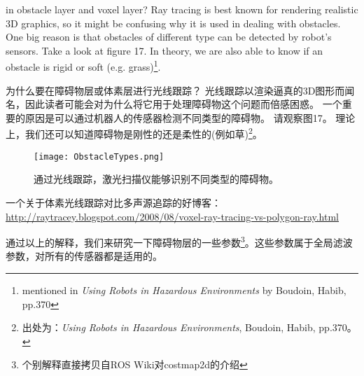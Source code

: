 
in obstacle layer and voxel layer? Ray tracing is best known for rendering realistic 3D graphics, so it might be confusing why it is used in dealing with obstacles. One big reason is that obstacles of different type can be detected by robot's sensors. Take a look at figure 17. In theory, we are also able to know if an obstacle is rigid or soft (e.g. grass)\footnote{ mentioned in \textit{Using Robots in Hazardous Environments} by Boudoin, Habib, pp.370}.

为什么要在障碍物层或体素层进行光线跟踪？
光线跟踪以渲染逼真的3D图形而闻名，因此读者可能会对为什么将它用于处理障碍物这个问题而倍感困惑。
一个重要的原因是可以通过机器人的传感器检测不同类型的障碍物。
请观察图17。
理论上，我们还可以知道障碍物是刚性的还是柔性的(例如草)\footnote{出处为：\textit{Using Robots in Hazardous Environments}, Boudoin, Habib, pp.370。}。

\begin{figure}[!h]
	\begin{center}
		\texttt{[image: ObstacleTypes.png]}
		\caption{通过光线跟踪，激光扫描仪能够识别不同类型的障碍物。}
	\end{center}
\end{figure}

一个关于体素光线跟踪对比多声源追踪的好博客：
\url{http://raytracey.blogspot.com/2008/08/voxel-ray-tracing-vs-polygon-ray.html} 

通过以上的解释，我们来研究一下障碍物层的一些参数\footnote{个别解释直接拷贝自ROS Wiki对costmap2d的介绍}。这些参数属于全局滤波参数，对所有的传感器都是适用的。


